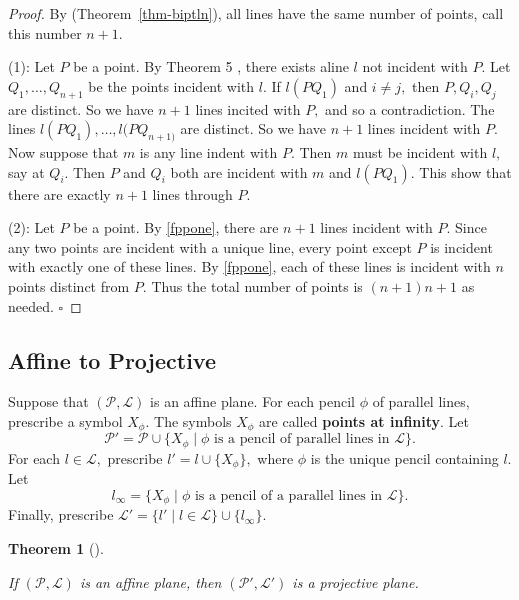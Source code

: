 \documentclass[
  twoside,
  12pt,
  letterpaper,
  fleqn]{article}
\theoremstyle{definition}
\theoremstyle{definition}
\theoremstyle{plain}
\theoremstyle{plain}
\newtheorem{theorem}{Theorem}[section]
\theoremstyle{remark}
\begin{document}
\begin{proof}

By (Theorem~\ref{thm-biptln}), all lines have the same number of points,
call this number \(n+1.\)

(1): Let \(P\) be a point. By Theorem 5 , there exists aline \(l\) not
incident with \(P.\) Let \(Q_1, \ldots, Q_{n+1}\) be the points incident
with \(l.\) If \(l(PQ_1)\) and \(i\neq j,\) then \(P, Q_i, Q_j\) are
distinct. So we have \(n+1\) lines incited with \(P,\) and so a
contradiction. The lines \(l(PQ_1), \ldots, l(PQ_{n+1)}\) are distinct.
So we have \(n+1\) lines incident with \(P.\) Now suppose that \(m\) is
any line indent with \(P.\) Then \(m\) must be incident with \(l,\) say
at \(Q_i.\) Then \(P\) and \(Q_i\) both are incident with \(m\) and
\(l(PQ_1).\) This show that there are exactly \(n+1\) lines through
\(P.\)

(2): Let \(P\) be a point. By \eqref{fppone}, there are \(n+1\) lines
incident with \(P.\) Since any two points are incident with a unique
line, every point except \(P\) is incident with exactly one of these
lines. By \eqref{fppone}, each of these lines is incident with \(n\)
points distinct from \(P.\) Thus the total number of points is
\((n+1)n+1\) as needed. \(\square\)

\end{proof}

\hypertarget{affine-to-projective}{%
\subsection{Affine to Projective}\label{affine-to-projective}}

Suppose that \((\mathcal{P},\mathcal{L})\) is an affine plane. For each
pencil \(\phi\) of parallel lines, prescribe a symbol \(X_\phi.\) The
symbols \(X_\phi\) are called \textbf{points at infinity}. Let \[
\mathcal{P}'
=\mathcal{P}\cup 
\{X_\phi \mid \phi \text{ is a pencil of parallel lines in $\mathcal{L}$}\}. 
\] For each \(l\in \mathcal{L},\) prescribe \(l'=l\cup \{X_\phi\},\)
where \(\phi\) is the unique pencil containing \(l.\) Let \[
l_{\infty}=\{X_{\phi} \mid \phi \text{ is a pencil of a parallel lines in $\mathcal{L}$} \}.
\] Finally, prescribe
\(\mathcal{L}'=\{l' \mid l \in \mathcal{L}\}\cup \{l_{\infty}\}.\)

\begin{theorem}[]\protect\hypertarget{thm-}{}\label{thm-}

If \((\mathcal{P},\mathcal{L})\) is an affine plane, then
\((\mathcal{P}',\mathcal{L}')\) is a projective plane.

\end{theorem}
\end{document}
